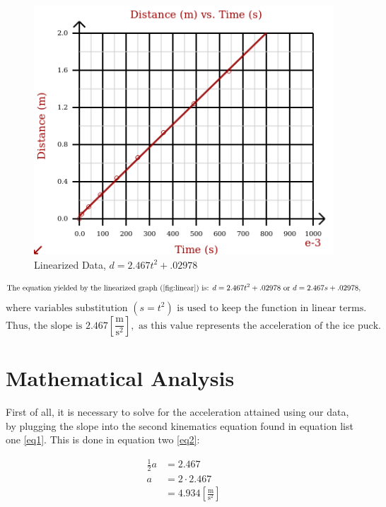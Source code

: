 \documentclass{article}
\begin{document}
\begin{figure}[H]
  \centering
  \includegraphics[width=.7\textwidth]{Figures/Linear.png}
  \caption{Linearized Data, $d=2.467t^2+.02978$}
  \label{fig:linear}
\end{figure}

  $$\text{The equation yielded by the linearized graph (\ref{fig:linear})  is: } d=2.467t^2+.02978 \text{ or } d=2.467s+.02978, $$
$$\text{where variables substitution } (s = t^2) \text{ is used to keep the function in linear terms.}$$
$$\text{Thus, the slope is } 2.467\left[\frac{\si{\meter}}{\si{\second\squared}}\right], \text{ as this value represents the acceleration of the ice puck.}$$

\section{Mathematical Analysis}

\begin{justify}

  First of all, it is necessary to solve for the acceleration attained using our data, by plugging the slope into the second kinematics equation found in equation list one \eqref{eq1}. This is done in equation two \eqref{eq2}:

\end{justify}

\begin{equation}
  \begin{split}
    \frac{1}{2}a & = 2.467\\
    a & = 2\cdot 2.467 \\
    & = 4.934\left[ \frac{\si{\meter}}{\si{\second\squared}} \right]
  \end{split}
  \label{eq2}
\end{equation}
\end{document}
